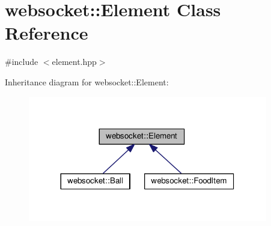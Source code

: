 \hypertarget{classwebsocket_1_1Element}{}\section{websocket\+:\+:Element Class Reference}
\label{classwebsocket_1_1Element}


{\ttfamily \#include $<$element.\+hpp$>$}



Inheritance diagram for websocket\+:\+:Element\+:
\nopagebreak
\begin{figure}[H]
\begin{center}
\leavevmode
\includegraphics[width=296pt]{classwebsocket_1_1Element__inherit__graph}
\end{center}
\end{figure}
